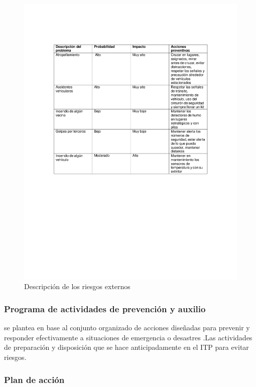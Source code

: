     \begin{figure}[H]
        \centering
        \includegraphics[trim = {10mm 90mm 10mm 10mm},clip,scale=0.5]{29/img/riesgoExternos.pdf}
        \caption{Descripción de los riesgos externos}
        \label{fig:riesgoExternos.pdff}
    \end{figure}
    \subsubsection{Programa de actividades de prevención y auxilio}
    se plantea en base al  conjunto organizado de acciones diseñadas para prevenir y responder efectivamente a situaciones de emergencia o desastres .Las actividades de preparación y disposición que se hace anticipadamente en el ITP para evitar riesgos.
    \subsubsection{Plan de acción}
    

